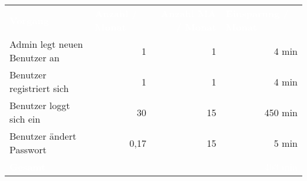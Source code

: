\begin{tabular}{lrrr}

\rowcolor{heading} 
\textcolor{white}{\textbf{Vorgang}} & \multicolumn{1}{l}{\textcolor{white}{\textbf{Anzahl / Monat}}} & \textcolor{white}{\textbf{Anzahl MA / Monat}} & \multicolumn{1}{l}{\textcolor{white}{\textbf{Einsparung / Monat}}} \\
Admin legt neuen Benutzer an & 1  & 1 & 4 min \\
\rowcolor{odd}Benutzer registriert sich & 1  & 1 & 4 min\\
Benutzer loggt sich ein & 30  & 15 & 450 min\\
\rowcolor{odd} Benutzer ändert Passwort & 0,17  & 15 & 5 min \\
\hline
\hline
\rowcolor{heading} \textcolor{white}{\textbf{Gesamt}} &  &  &  \textcolor{white}{463 min} \\
\end{tabular}
